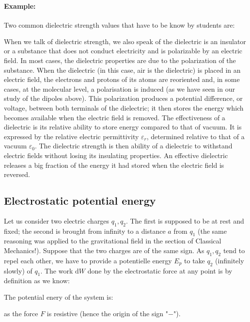 	\begin{tcolorbox}[colframe=black,colback=white,sharp corners]
	\textbf{{\Large {}}Example:}\\\\
	Two common dielectric strength values that have to be know by students are:
	
	\end{tcolorbox}
	When we talk of dielectric strength, we also speak of the dielectric is an insulator or a substance that does not conduct electricity and is polarizable by an electric field. In most cases, the dielectric properties are due to the polarization of the substance. When the dielectric (in this case, air is the dielectric) is placed in an electric field, the electrons and protons of its atoms are reoriented and, in some cases, at the molecular level, a polarisation is induced (as we have seen in our study of the dipoles above). This polarization produces a potential difference, or voltage, between both terminals of the dielectric; it then stores the energy which becomes available when the electric field is removed. The effectiveness of a dielectric is its relative ability to store energy compared to that of vacuum. It is expressed by the relative electric permittivity $\varepsilon_r$, determined relative to that of a vacuum $\varepsilon_0$. The dielectric strength is then ability of a dielectric to withstand electric fields without losing its insulating properties. An effective dielectric releases a big fraction of the energy it had stored when the electric field is reversed.
	
	\subsection{Electrostatic potential energy}
	Let us consider two electric charges $q_1,q_2$. The first is supposed to be at rest and fixed; the second is brought from infinity to a distance $a$ from $q_1$ (the same reasoning was applied to the gravitational field in the section of Classical Mechanics!). Suppose that the two charges are of the same sign. As $q_1,q_2$ tend to repel each other, we have to provide a potentielle energy $E_p$ to take $q_2$ (infinitely slowly) of $q_1$. The work $\mathrm{d}W$ done by the electrostatic force at any point is by definition as we know:
	
	The potential enery of the system is:
	
	as the force $F$ is resistive (hence the origin of the sign "$-$").

